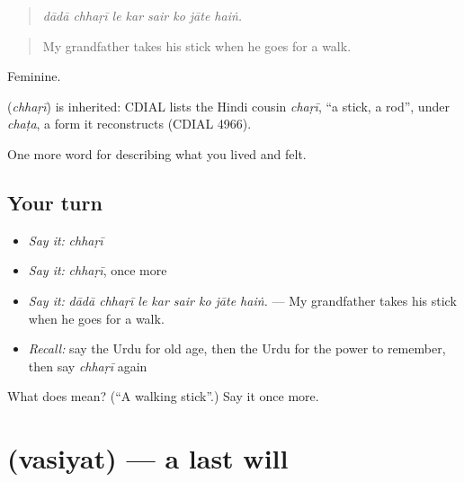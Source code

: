 \begin{quote}
       
\end{quote}

\begin{quote}
\emph{dādā chhaṛī le kar sair ko jāte haiṅ.}
\end{quote}

\begin{quote}
My grandfather takes his stick when he goes for a walk.
\end{quote}

Feminine.

\begin{cousinweb}
\textbf{} (\emph{chhaṛī}) is inherited: CDIAL lists the Hindi cousin \emph{chaṛī}, \textquotedblleft{}a stick, a rod\textquotedblright{}, under \emph{chaṭa}, a form it reconstructs (CDIAL 4966).
\end{cousinweb}

\begin{grammarlens}[title={What you've built}]
One more word for describing what you lived and felt.
\end{grammarlens}

\subsection*{Your turn}
\begin{itemize}
\raggedright
  \item \emph{Say it:} \emph{chhaṛī}
  \item \emph{Say it:} \emph{chhaṛī}, once more
  \item \emph{Say it:} \emph{dādā chhaṛī le kar sair ko jāte haiṅ.} — My grandfather takes his stick when he goes for a walk.
  \item \emph{Recall:} say the Urdu for old age, then the Urdu for the power to remember, then say \emph{chhaṛī} again
\end{itemize}

\begin{tcolorbox}[breakable,colback=teal!4,colframe=teal!35!black,title={Before you move on}]
What does  mean? (\textquotedblleft{}A walking stick\textquotedblright{}.) Say it once more.
\end{tcolorbox}
\section[\texorpdfstring{\ur{وصیت} (vasiyat)}{وصیت (vasiyat)}]{ (vasiyat) — a last will}

